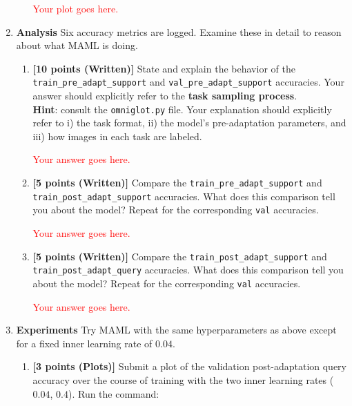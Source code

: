 \documentclass[12pt]{article}
\begin{document}
\begin{enumerate}
\begin{enumerate}
    \textcolor{red}{Your plot goes here.}
        
    \end{enumerate}
    
    \newpage
    \item \textbf{Analysis} Six accuracy metrics are logged. Examine these in detail to reason about what MAML is doing.
    \begin{enumerate}[label=(\alph*)]
        \item \textbf{[10 points (Written)]} State and explain the behavior of the \texttt{train\_pre\_adapt\_support} and
       \texttt{val\_pre\_adapt\_support} accuracies. Your answer should explicitly refer to the \textbf{task sampling process}. \\ \textbf{Hint}: consult the \texttt{omniglot.py} file. Your explanation should explicitly refer to i) the task format, ii) the model’s pre-adaptation parameters, and iii) how images in each task are labeled.

        \textcolor{red}{Your answer goes here.}

    
        \item \textbf{[5 points (Written)]} Compare the \texttt{train\_pre\_adapt\_support} and \newline \texttt{train\_post\_adapt\_support} accuracies. What does this comparison tell you about the model? Repeat for the corresponding \texttt{val} accuracies.

        \textcolor{red}{Your answer goes here.}
        
        \item \textbf{[5 points (Written)]} Compare the \texttt{train\_post\_adapt\_support} and \newline \texttt{train\_post\_adapt\_query} accuracies. What does this comparison tell you about the model? Repeat for the corresponding \texttt{val} accuracies.
        
        \textcolor{red}{Your answer goes here.}

    \end{enumerate}

    \newpage
    \item \textbf{Experiments} Try MAML with the same hyperparameters as above except for a fixed inner learning rate of $0.04$.
    \begin{enumerate}[label=(\alph*)]
        \item \textbf{[3 points (Plots)]} Submit a plot of the validation post-adaptation query accuracy over the course of training with the two inner learning rates ($0.04$, $0.4$). Run the command:
        

\end{enumerate}
\end{enumerate}
\end{document}
